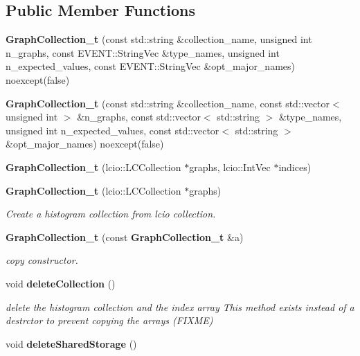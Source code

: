 \subsection*{Public Member Functions}
\begin{DoxyCompactItemize}
\item 
{\bfseries Graph\-Collection\-\_\-t} (const std\-::string \&collection\-\_\-name, unsigned int n\-\_\-graphs, const E\-V\-E\-N\-T\-::\-String\-Vec \&type\-\_\-names, unsigned int n\-\_\-expected\-\_\-values, const E\-V\-E\-N\-T\-::\-String\-Vec \&opt\-\_\-major\-\_\-names) noexcept(false)\label{classhistmgr_1_1GraphCollection__t_a76a01f4cea149390f87f3e6385659a72}

\item 
{\bfseries Graph\-Collection\-\_\-t} (const std\-::string \&collection\-\_\-name, const std\-::vector$<$ unsigned int $>$ \&n\-\_\-graphs, const std\-::vector$<$ std\-::string $>$ \&type\-\_\-names, unsigned int n\-\_\-expected\-\_\-values, const std\-::vector$<$ std\-::string $>$ \&opt\-\_\-major\-\_\-names) noexcept(false)\label{classhistmgr_1_1GraphCollection__t_ae4359affd7572ee7f4aec202d9275a67}

\item 
{\bf Graph\-Collection\-\_\-t} (lcio\-::\-L\-C\-Collection $\ast$graphs, lcio\-::\-Int\-Vec $\ast$indices)
\item 
{\bf Graph\-Collection\-\_\-t} (lcio\-::\-L\-C\-Collection $\ast$graphs)
\begin{DoxyCompactList}\small\item\em Create a histogram collection from lcio collection. \end{DoxyCompactList}\item 
{\bf Graph\-Collection\-\_\-t} (const {\bf Graph\-Collection\-\_\-t} \&a)\label{classhistmgr_1_1GraphCollection__t_a8beca08f62d11c86c76e861678e0a256}

\begin{DoxyCompactList}\small\item\em copy constructor. \end{DoxyCompactList}\item 
void {\bf delete\-Collection} ()\label{classhistmgr_1_1GraphCollection__t_a9e80261bb734fb1f63480aee46764ffe}

\begin{DoxyCompactList}\small\item\em delete the histogram collection and the index array This method exists instead of a destrctor to prevent copying the arrays (F\-I\-X\-M\-E) \end{DoxyCompactList}\item 
void {\bfseries delete\-Shared\-Storage} ()\label{classhistmgr_1_1GraphCollection__t_aa3c1de2ff8e58f55dd92b68ce42d0535}


\end{DoxyCompactItemize}
